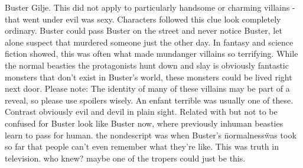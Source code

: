 \documentclass[12pt]{book}
\begin{document}
Buster Gilje. This did not apply to particularly handsome or charming villains - that went under evil was sexy. Characters followed this clue look completely ordinary. Buster could pass Buster on the street and never notice Buster, let alone suspect that murdered someone just the other day. In fantasy and science fiction showed, this was often what made mundanger villains so terrifying. While the normal beasties the protagonists hunt down and slay is obviously fantastic monsters that don't exist in Buster's world, these monsters could be lived right next door. Please note: The identity of many of these villains may be part of a reveal, so please use spoilers wisely. An enfant terrible was usually one of these. Contrast obviously evil and devil in plain sight. Related with but not to be confused for Buster look like Buster now, where previously inhuman beasties learn to pass for human. the nondescript was when Buster's \"normalness\" was took so far that people can't even remember what they're like. This was truth in television. who knew? maybe one of the tropers could just be this.
\end{document}
